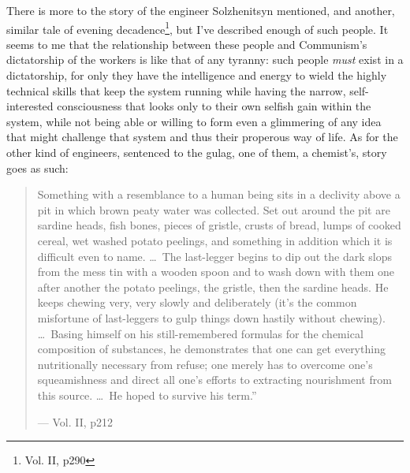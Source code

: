 \documentclass{article}
\begin{document}
%

There is more to the story of the engineer Solzhenitsyn mentioned, and another, similar tale of evening decadence\footnote{Vol. II, p290}, but I've described enough of such people.  It seems to me that the relationship between these people and Communism's dictatorship of the workers is like that of any tyranny: such people \emph{must} exist in a dictatorship, for only they have the intelligence and energy to wield the highly technical skills that keep the system running while having the narrow, self-interested consciousness that looks only to their own selfish gain within the system, while not being able or willing to form even a glimmering of any idea that might challenge that system and thus their properous way of life.  As for the other kind of engineers, sentenced to the gulag, one of them, a chemist's, story goes as such:

\begin{quote}
Something with a resemblance to a human being sits in a declivity above a pit in which brown peaty water was collected.  Set out around the pit are sardine heads, fish bones, pieces of gristle, crusts of bread, lumps of cooked cereal, wet washed potato peelings, and something in addition which it is difficult even to name. \ldots~The last-legger begins to dip out the dark slops from the mess tin with a wooden spoon and to wash down with them one after another the potato peelings, the gristle, then the sardine heads.  He keeps chewing very, very slowly and deliberately (it's the common misfortune of last-leggers to gulp things down hastily without chewing). \ldots~Basing himself on his still-remembered formulas for the chemical composition of substances, he demonstrates that one can get everything nutritionally necessary from refuse; one merely has to overcome one's squeamishness and direct all one's efforts to extracting nourishment from this source. \ldots~He hoped to survive his term.''

--- Vol. II, p212
\end{quote}
\end{document}
